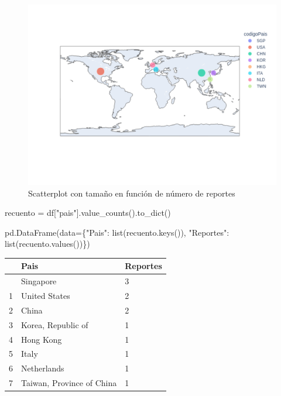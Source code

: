 \documentclass[
  letterpaper,
  DIV=11,
  numbers=noendperiod]{scrartcl}
\newenvironment{Shaded}{\begin{snugshade}}{\end{snugshade}}
\newcommand{\BuiltInTok}[1]{\textcolor[rgb]{0.00,0.23,0.31}{#1}}
\newcommand{\NormalTok}[1]{\textcolor[rgb]{0.00,0.23,0.31}{#1}}
\newcommand{\OperatorTok}[1]{\textcolor[rgb]{0.37,0.37,0.37}{#1}}
\newcommand{\StringTok}[1]{\textcolor[rgb]{0.13,0.47,0.30}{#1}}
\begin{document}
\begin{figure}[H]

{\centering \includegraphics{Análisis_files/figure-pdf/fig-scatergeo-output-1.png}

}

\caption{\label{fig-scatergeo}Scatterplot con tamaño en función de
número de reportes}

\end{figure}

\begin{Shaded}
\begin{Highlighting}[]
\NormalTok{recuento }\OperatorTok{=}\NormalTok{ df[}\StringTok{"pais"}\NormalTok{].value\_counts().to\_dict()}

\NormalTok{pd.DataFrame(data}\OperatorTok{=}\NormalTok{\{}\StringTok{"Pais"}\NormalTok{: }\BuiltInTok{list}\NormalTok{(recuento.keys()), }\StringTok{"Reportes"}\NormalTok{: }\BuiltInTok{list}\NormalTok{(recuento.values())\})}
\end{Highlighting}
\end{Shaded}

\begin{longtable}[]{@{}lll@{}}
\toprule\noalign{}
& Pais & Reportes \\
\midrule\noalign{}
\endhead
\bottomrule\noalign{}
\endlastfoot
0 & Singapore & 3 \\
1 & United States & 2 \\
2 & China & 2 \\
3 & Korea, Republic of & 1 \\
4 & Hong Kong & 1 \\
5 & Italy & 1 \\
6 & Netherlands & 1 \\
7 & Taiwan, Province of China & 1 \\
\end{longtable}
\end{document}
